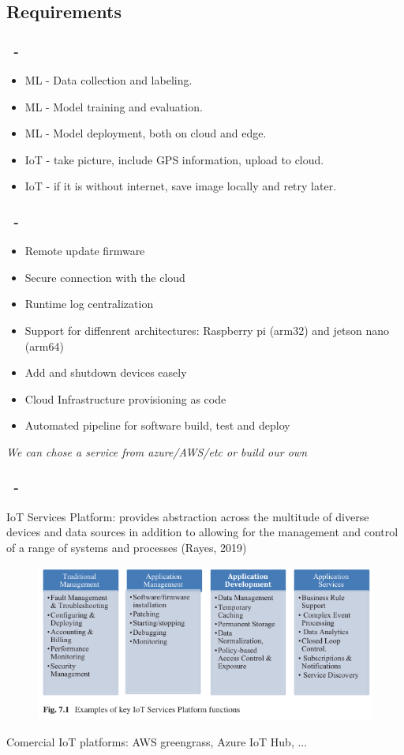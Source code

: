 \documentclass{beamer}
\begin{document}

\subsection{Requirements}
\begin{frame}
\frametitle{\secname\ - \subsecname}
\begin{itemize}
\item ML - Data collection and labeling.
\item ML - Model training and evaluation.
\item ML - Model deployment, both on cloud and edge.
\item IoT - take picture, include GPS information, upload to cloud.
\item IoT - if it is without internet, save image locally and retry later.
\end{itemize}
\end{frame}


\begin{frame}
\frametitle{\secname\ - \subsecname}
\begin{itemize}
\item Remote update firmware
\item Secure connection with the cloud
\item Runtime log centralization
\item Support for diffenrent architectures: Raspberry pi (arm32) and jetson nano (arm64)
\item Add and shutdown devices easely
\item Cloud Infrastructure provisioning as code
\item Automated pipeline for software build, test and deploy
\end{itemize}
\textit{We can chose a service from azure/AWS/etc or build our own}
\end{frame}


\begin{frame}
\frametitle{\secname\ - \subsecname}
IoT Services Platform: provides abstraction across the multitude of diverse devices and data sources in addition to allowing for the management and control of a range of systems and processes (Rayes, 2019)

\begin{figure}
\includegraphics[width=0.9\linewidth]{Imagens/iot-service-platform.png}
\end{figure}

Comercial IoT  platforms: AWS greengrass, Azure IoT Hub, ...

\end{frame}
\end{document}
